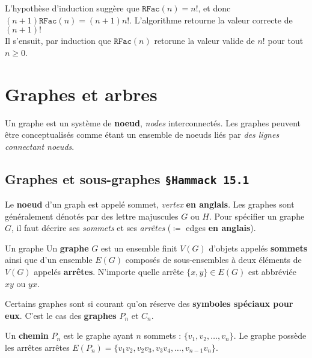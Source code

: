 \documentclass[16pt]{report}
\begin{document}
\begin{multicols*}{2}
\begin{Preuve}{}{}
                L'hypothèse d'induction suggère que $\texttt{RFac}(n) = n!$, et donc 
                $(n+1)\texttt{RFac}(n) = (n+1)n!$. L'algorithme retourne la valeur correcte de $(n+1)!$
                \vspace{1em}\\
                Il s'ensuit, par induction que $\texttt{RFac}(n)$ retorune la valeur valide de $n!$ pour tout 
                $n \geq 0$. 
            \end{Preuve}

    \chapter{Graphes et arbres}
     Un graphe est un système de \textbf{noeud}, \textit{nodes} interconnectés. Les graphes peuvent être 
     conceptualisés comme étant un ensemble de noeuds liés par \textit{des lignes connectant noeuds}.   

        \section{Graphes et sous-graphes \texttt{\small{\S Hammack 15.1}}}
            Le \textbf{noeud} d'un graph est appelé sommet, \textit{vertex} \textbf{en anglais}.  
            Les graphes sont généralement dénotés par des lettre majuscules $G$ ou $H$. Pour spécifier un graphe 
            $G$, il faut décrire ses \textit{sommets} et ses \textit{arrêtes} 
            ($\coloneqq $  edges \textbf{en anglais}).  
            \begin{Definitionx}{Un graphe}{}
                Un \textbf{graphe} $G$ est un ensemble finit $V(G)$ d'objets appelés \textbf{sommets} ainsi que 
                d'un ensemble $E(G)$ composés de sous-ensembles à deux éléments de $V(G)$ appelés \textbf{arrêtes}.
                N'importe quelle arrête $\{x, y\} \in E(G)$ est abbréviée $xy$ ou $yx$. 
            \end{Definitionx}
            \pagebreak
            Certains graphes sont si courant qu'on réserve des \textbf{symboles spéciaux pour eux}. C'est le cas 
            des \textbf{graphes} $P_n$ et $C_n$.   
            \begin{Definitionx}{}{}
                Un \textbf{chemin} $P_n$ est le graphe ayant $n$ sommets : $\{v_1, v_2, \dots, v_n \}$. 
                Le graphe possède les arrêtes arrêtes 
                $E(P_n) = \{v_1v_2, v_2v_3, v_3v_4, \dots, v_{n-1}v_n \}$.  
            \end{Definitionx}


\end{multicols*}
\end{document}
